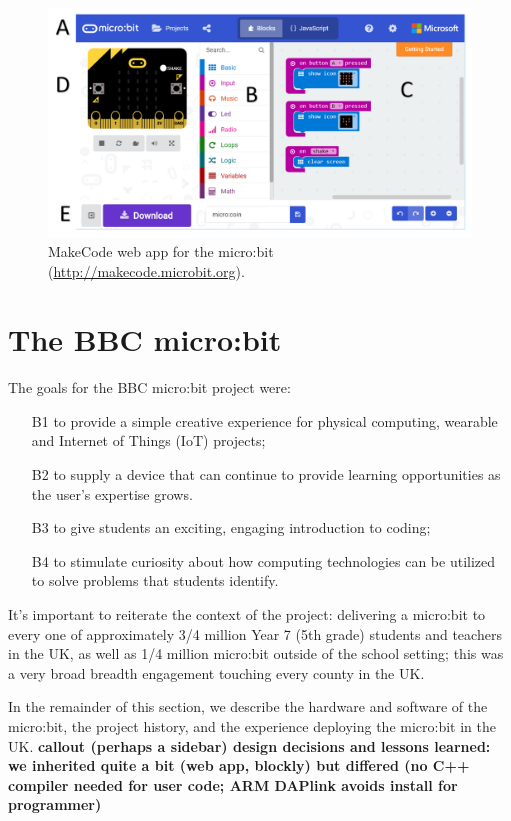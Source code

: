 \begin{figure}[t]
    \includegraphics[width=6in]{images/webApp.png}
    \caption{\label{fig:snapshot}MakeCode web app for the micro:bit (\url{http://makecode.microbit.org}).}
  \end{figure}

\section{The BBC micro:bit}
\label{sec:microbit}

The goals for the BBC micro:bit project were:
\begin{itemize}
    \item[B1] to provide a simple creative experience for physical computing, wearable and Internet of Things (IoT) projects;
    \item[B2] to supply a device that can continue to provide learning opportunities as the user's expertise grows.
    \item[B3] to give students an exciting, engaging introduction to coding;
    \item[B4] to stimulate curiosity about how computing technologies can be utilized to solve problems that students identify.
\end{itemize}

It's important to reiterate the context of the project: 
delivering a micro:bit to every one of 
approximately 3/4 million Year 7 (5th grade) students and teachers in the UK, as
well as 1/4 million micro:bit outside of the school setting; this was a very
broad breadth engagement touching every county in the UK.

In the remainder of this section, we describe the hardware and software
of the micro:bit, the project history, and the experience deploying
the micro:bit in the UK. {\bf callout (perhaps a sidebar) design decisions and
lessons learned: we inherited quite a bit (web app, blockly) but differed
(no C++ compiler needed for user code; ARM DAPlink avoids install for programmer)}

